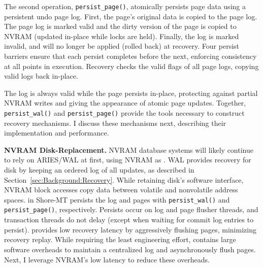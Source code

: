 The second operation, \texttt{persist\_page()}, atomically persists page data using a persistent undo page log.
First, the page's original data is copied to the page log.
The page log is marked valid and the dirty version of the page is copied to NVRAM (updated in-place while locks are held).
Finally, the log is marked invalid, and will no longer be applied (rolled back) at recovery.
Four persist barriers ensure that each persist completes before the next, enforcing consistency at all points in execution.
Recovery checks the valid flags of all page logs, copying valid logs back in-place.

The log is always valid while the page persists in-place, protecting against partial NVRAM writes and giving the appearance of atomic page updates.
Together, \texttt{persist\_wal()} and \texttt{persist\_page()} provide the tools necessary to construct recovery mechanisms.
I discuss these mechanisms next, describing their implementation and performance.

\textbf{NVRAM Disk-Replacement.}
NVRAM database systems will likely continue to rely on ARIES/WAL at first, using NVRAM as \NVDisk.
WAL provides recovery for disk by keeping an ordered log of all updates, as described in Section~\ref{sec:Background:Recovery}.
While retaining disk's software interface, NVRAM block accesses copy data between volatile and nonvolatile address spaces.
\NVDisk in Shore-MT persists the log and pages with \texttt{persist\_wal()} and \texttt{persist\_page()}, respectively.
Persists occur on log and page flusher threads, and transaction threads do not delay (except when waiting for commit log entries to persist).
\NVDisk provides low recovery latency by aggressively flushing pages, minimizing recovery replay.
While requiring the least engineering effort, \NVDisk contains large software overheads to maintain a centralized log and asynchronously flush pages.
Next, I leverage NVRAM's low latency to reduce these overheads.

